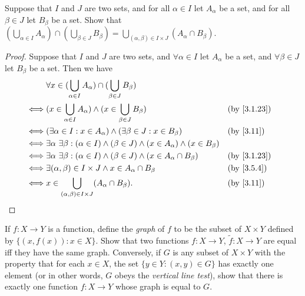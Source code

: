 \begin{ex}\label{ex:3.5.9}
  Suppose that \(I\) and \(J\) are two sets, and for all \(\alpha \in I\) let \(A_{\alpha}\) be a set, and for all \(\beta \in J\) let \(B_{\beta}\) be a set.
  Show that \((\bigcup_{\alpha \in I} A_{\alpha}) \cap (\bigcup_{\beta \in J} B_{\beta}) = \bigcup_{(\alpha, \beta) \in I \times J} (A_{\alpha} \cap B_{\beta})\).
\end{ex}

\begin{proof}
  Suppose that \(I\) and \(J\) are two sets, and \(\forall \alpha \in I\) let \(A_{\alpha}\) be a set, and \(\forall \beta \in J\) let \(B_{\beta}\) be a set.
  Then we have
  \begin{align*}
         & \forall x \in (\bigcup_{\alpha \in I} A_{\alpha}) \cap (\bigcup_{\beta \in J} B_{\beta})                                                          \\
    \iff & (x \in \bigcup_{\alpha \in I} A_{\alpha}) \land (x \in \bigcup_{\beta \in J} B_{\beta})                              &  & \by{3.1.23}             \\
    \iff & (\exists \alpha \in I : x \in A_{\alpha}) \land (\exists \beta \in J : x \in B_{\beta})                              &  & \text{(by \cref{3.11})} \\
    \iff & \exists \alpha \ \exists \beta : (\alpha \in I) \land (\beta \in J) \land (x \in A_{\alpha}) \land (x \in B_{\beta})                              \\
    \iff & \exists \alpha \ \exists \beta : (\alpha \in I) \land (\beta \in J) \land (x \in A_{\alpha} \cap B_{\beta})          &  & \by{3.1.23}             \\
    \iff & \exists (\alpha, \beta) \in I \times J \land x \in A_{\alpha} \cap B_{\beta}                                         &  & \by{3.5.4}              \\
    \iff & x \in \bigcup_{(\alpha, \beta) \in I \times J} (A_{\alpha} \cap B_{\beta}).                                          &  & \text{(by \cref{3.11})}
  \end{align*}
\end{proof}

\begin{ex}\label{ex:3.5.10}
  If \(f : X \to Y\) is a function, define the \emph{graph} of \(f\) to be the subset of \(X \times Y\) defined by \(\{(x, f(x)) : x \in X\}\).
  Show that two functions \(f : X \to Y\), \(\tilde{f} : X \to Y\) are equal iff they have the same graph.
  Conversely, if \(G\) is any subset of \(X \times Y\) with the property that for each \(x \in X\), the set \(\{y \in Y : (x, y) \in G\}\) has exactly one element (or in other words, \(G\) obeys the \emph{vertical line test}), show that there is exactly one function \(f : X \to Y\) whose graph is equal to \(G\).
\end{ex}


